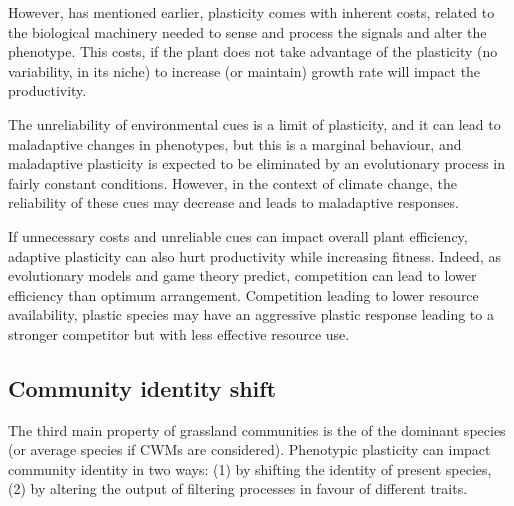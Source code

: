 However, has mentioned earlier, plasticity comes with inherent costs, related to the biological machinery needed to sense and process the signals and alter the phenotype. This costs, if the plant does not take advantage of the plasticity (no variability, in its niche) to increase (or maintain) growth rate will impact the productivity.

The unreliability of environmental cues is a limit of plasticity, and it can lead to maladaptive changes in phenotypes, but this is a marginal behaviour, and maladaptive plasticity is expected to be eliminated by an evolutionary process in fairly constant conditions. However, in the context of climate change, the reliability of these cues may decrease and leads to maladaptive responses. 

If unnecessary costs and unreliable cues can impact overall plant efficiency, adaptive plasticity can also hurt productivity while increasing fitness. Indeed, as evolutionary models and game theory predict, competition can lead to lower efficiency than optimum arrangement. Competition leading to lower resource availability, plastic species may have an aggressive plastic response leading to a stronger competitor but with less effective resource use.


%
%
%


\subsection{Community identity shift}

The third main property of grassland communities is the  of the dominant species (or average species if CWMs are considered). Phenotypic plasticity can impact community identity in two ways: (1) by shifting the identity of present species, (2) by altering the output of filtering processes in favour of different traits.


